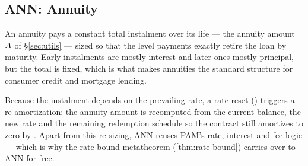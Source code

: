 \subsection{ANN: Annuity}\label{sec:ann}

An annuity pays a constant total instalment over its life --- the annuity
amount $A$ of \S\ref{sec:utils} --- sized so that the level payments
exactly retire the loan by maturity.  Early instalments are mostly interest and
later ones mostly principal, but the total is fixed, which is what makes
annuities the standard structure for consumer credit and mortgage lending.

Because the instalment depends on the prevailing rate, a rate reset ()
triggers a re-amortization: the annuity amount is recomputed from the current
balance, the new rate and the remaining redemption schedule so the contract
still amortizes to zero by .  Apart from this re-sizing, ANN reuses
PAM's rate, interest and fee logic --- which is why the rate-bound metatheorem
(\ref{thm:rate-bound}) carries over to ANN for free.

